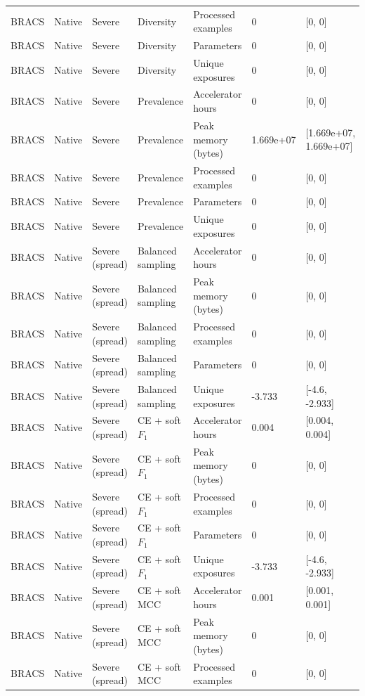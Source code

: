 \begin{longtable}{lllllll}
BRACS & Native & Severe & Diversity & Processed examples & 0 & [0, 0] \\
BRACS & Native & Severe & Diversity & Parameters & 0 & [0, 0] \\
BRACS & Native & Severe & Diversity & Unique exposures & 0 & [0, 0] \\
BRACS & Native & Severe & Prevalence & Accelerator hours & 0 & [0, 0] \\
BRACS & Native & Severe & Prevalence & Peak memory (bytes) & 1.669e+07 & [1.669e+07, 1.669e+07] \\
BRACS & Native & Severe & Prevalence & Processed examples & 0 & [0, 0] \\
BRACS & Native & Severe & Prevalence & Parameters & 0 & [0, 0] \\
BRACS & Native & Severe & Prevalence & Unique exposures & 0 & [0, 0] \\
BRACS & Native & Severe (spread) & Balanced sampling & Accelerator hours & 0 & [0, 0] \\
BRACS & Native & Severe (spread) & Balanced sampling & Peak memory (bytes) & 0 & [0, 0] \\
BRACS & Native & Severe (spread) & Balanced sampling & Processed examples & 0 & [0, 0] \\
BRACS & Native & Severe (spread) & Balanced sampling & Parameters & 0 & [0, 0] \\
BRACS & Native & Severe (spread) & Balanced sampling & Unique exposures & -3.733 & [-4.6, -2.933] \\
BRACS & Native & Severe (spread) & CE + soft $F_1$ & Accelerator hours & 0.004 & [0.004, 0.004] \\
BRACS & Native & Severe (spread) & CE + soft $F_1$ & Peak memory (bytes) & 0 & [0, 0] \\
BRACS & Native & Severe (spread) & CE + soft $F_1$ & Processed examples & 0 & [0, 0] \\
BRACS & Native & Severe (spread) & CE + soft $F_1$ & Parameters & 0 & [0, 0] \\
BRACS & Native & Severe (spread) & CE + soft $F_1$ & Unique exposures & -3.733 & [-4.6, -2.933] \\
BRACS & Native & Severe (spread) & CE + soft MCC & Accelerator hours & 0.001 & [0.001, 0.001] \\
BRACS & Native & Severe (spread) & CE + soft MCC & Peak memory (bytes) & 0 & [0, 0] \\
BRACS & Native & Severe (spread) & CE + soft MCC & Processed examples & 0 & [0, 0] \\

\end{longtable}

